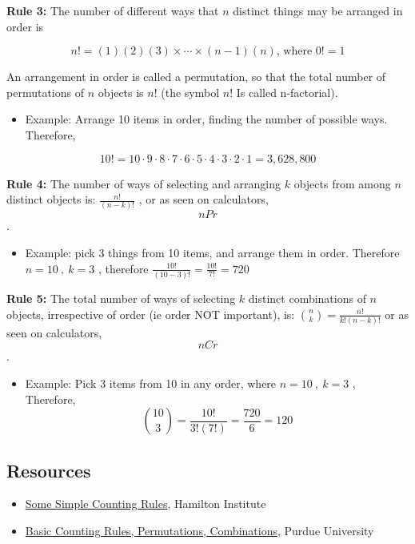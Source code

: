 \textbf{Rule 3:} The number of different ways that $n$ distinct things may be arranged in order is

$$n!=(1)(2)(3)\times\cdots\times(n-1)(n) \text{, where } 0!=1$$

An arrangement in order is called a permutation, so that the total number of permutations
of $n$ objects is $n!$ (the symbol $n!$ Is called n-factorial).



\begin{itemize}
    \item Example: Arrange 10 items in order, finding the number of possible ways. Therefore,
\end{itemize}
$$10!=10\cdot9\cdot8\cdot7\cdot6\cdot5\cdot4\cdot3\cdot2\cdot1=3,628,800$$



\textbf{Rule 4:} The number of ways of selecting and arranging $k$ objects from among $n$ distinct objects is: $\frac{n!}{(n-k)!}$ , or as seen on calculators, \[nPr\].



\begin{itemize}
    \item Example: pick 3 things from 10 items, and arrange them in order. Therefore $n=10\ ,\ k=3$ , therefore $\frac{10!}{(10-3)!}=\frac{10!}{7!}=720$
\end{itemize}

\textbf{Rule 5:} The total number of ways of selecting $k$ distinct combinations of $n$ objects, irrespective of order (ie order NOT important), is: $\binom{n}{k}=\frac{n!}{k!(n-k)!}$ or as seen on calculators, \[nCr\].



\begin{itemize}
    \item Example: Pick 3 items from 10 in any order, where $n=10\ ,\ k=3$ , Therefore, $$\binom{10}{3}=\frac{10!}{3!(7!)}=\frac{720}{6}=120$$
\end{itemize}


\subsection{Resources}
\label{sss:reso-55b5}




\begin{itemize}
    \item \href{https://www.hamilton.ie/ollie/EE304/Counting.pdf}{Some Simple Counting Rules}, Hamilton Institute
    \item \href{https://www.stat.purdue.edu/\textasciitilde{}huang251/slides4.pdf}{Basic Counting Rules, Permutations, Combinations}, Purdue University
\end{itemize}


